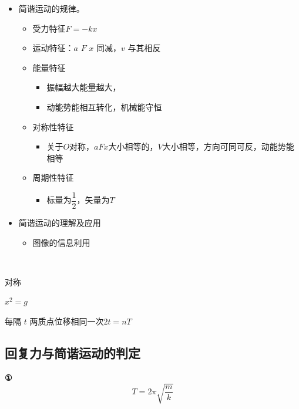 \begin{itemize}
\item 简谐运动的规律。
  \begin{itemize}
  \item 受力特征\quad $F=-kx$
  \item 运动特征：$a$ $F$ $x$ 同减，$v$ 与其相反
  \item 能量特征
    \begin{itemize}
    \item 振幅越大能量越大，
    \item 动能势能相互转化，机械能守恒
    \end{itemize}
  \item 对称性特征
    \begin{itemize}
    \item 关于$O$对称，$aFx$大小相等的，$V$大小相等，方向可同可反，动能势能相等
    \end{itemize}
  \item 周期性特征
    \begin{itemize}
    \item 标量为$\dfrac{1}{2}$，矢量为$T$
    \end{itemize}
  \end{itemize}
\item 简谐运动的理解及应用
  \begin{itemize}
  \item 图像的信息利用
  \end{itemize}
\end{itemize}


对称　\ \ 

\quad $x^2=g$%

每隔 $t$ 两质点位移相同一次\quad $2t=nT$

\subsection{回复力与简谐运动的判定}
\textbf{①}
\[
T=2\pi\sqrt{\dfrac{m}{k}}
\]

